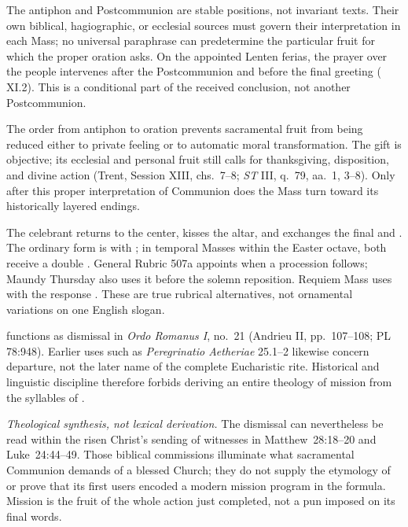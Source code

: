 The antiphon and Postcommunion are stable positions, not invariant texts. Their own biblical, hagiographic, or ecclesial sources must govern their interpretation in each Mass; no universal paraphrase can predetermine the particular fruit for which the proper oration asks. On the appointed Lenten ferias, the prayer over the people intervenes after the Postcommunion and before the final greeting ( XI.2). This is a conditional part of the received conclusion, not another Postcommunion.

The order from antiphon to oration prevents sacramental fruit from being reduced either to private feeling or to automatic moral transformation. The gift is objective; its ecclesial and personal fruit still calls for thanksgiving, disposition, and divine action (Trent, Session XIII, chs.~7--8; \emph{ST} III, q.~79, aa.~1, 3--8). Only after this proper interpretation of Communion does the Mass turn toward its historically layered endings.


The celebrant returns to the center, kisses the altar, and exchanges the final  and . The ordinary form is  with ; in temporal Masses within the Easter octave, both receive a double . General Rubric 507a appoints  when a procession follows; Maundy Thursday also uses it before the solemn reposition. Requiem Mass uses  with the response . These are true rubrical alternatives, not ornamental variations on one English slogan.

 functions as dismissal in \emph{Ordo Romanus I}, no.~21 (Andrieu II, pp.~107--108; PL 78:948). Earlier uses such as \emph{Peregrinatio Aetheriae} 25.1--2 likewise concern departure, not the later name of the complete Eucharistic rite. Historical and linguistic discipline therefore forbids deriving an entire theology of mission from the syllables of .

\textit{Theological synthesis, not lexical derivation.} The dismissal can nevertheless be read within the risen Christ's sending of witnesses in Matthew~28:18--20 and Luke~24:44--49. Those biblical commissions illuminate what sacramental Communion demands of a blessed Church; they do not supply the etymology of  or prove that its first users encoded a modern mission program in the formula. Mission is the fruit of the whole action just completed, not a pun imposed on its final words.


